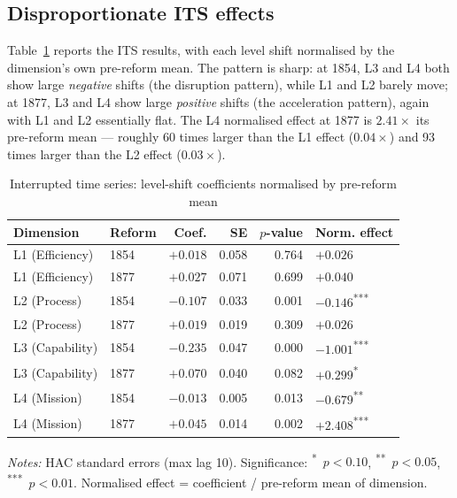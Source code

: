 \documentclass[11pt]{article}
\begin{document}
\subsection{Disproportionate ITS effects}

Table~\ref{tab:its} reports the ITS results, with each level shift normalised by the dimension's own pre-reform mean. The pattern is sharp: at 1854, L3 and L4 both show large \emph{negative} shifts (the disruption pattern), while L1 and L2 barely move; at 1877, L3 and L4 show large \emph{positive} shifts (the acceleration pattern), again with L1 and L2 essentially flat. The L4 normalised effect at 1877 is $2.41\times$ its pre-reform mean --- roughly 60 times larger than the L1 effect ($0.04\times$) and 93 times larger than the L2 effect ($0.03\times$).

\begin{table}[t]
\centering
\caption{Interrupted time series: level-shift coefficients normalised by pre-reform mean}
\label{tab:its}
\small
\begin{tabular}{llrrrl}
\toprule
Dimension & Reform & Coef. & SE & $p$-value & Norm. effect \\
\midrule
L1 (Efficiency)        & 1854 & $+0.018$ & 0.058 & 0.764 & $+0.026$ \\
L1 (Efficiency)        & 1877 & $+0.027$ & 0.071 & 0.699 & $+0.040$ \\
L2 (Process)           & 1854 & $-0.107$ & 0.033 & 0.001 & $-0.146$\textsuperscript{***} \\
L2 (Process)           & 1877 & $+0.019$ & 0.019 & 0.309 & $+0.026$ \\
L3 (Capability)        & 1854 & $-0.235$ & 0.047 & 0.000 & $-1.001$\textsuperscript{***} \\
L3 (Capability)        & 1877 & $+0.070$ & 0.040 & 0.082 & $+0.299$\textsuperscript{*} \\
L4 (Mission)           & 1854 & $-0.013$ & 0.005 & 0.013 & $-0.679$\textsuperscript{**} \\
L4 (Mission)           & 1877 & $+0.045$ & 0.014 & 0.002 & $+\mathbf{2.408}$\textsuperscript{***} \\
\bottomrule
\end{tabular}

\medskip
\footnotesize
\textit{Notes:} HAC standard errors (max lag 10). Significance: \textsuperscript{*}~$p<0.10$, \textsuperscript{**}~$p<0.05$, \textsuperscript{***}~$p<0.01$. Normalised effect = coefficient / pre-reform mean of dimension.
\end{table}
\end{document}
